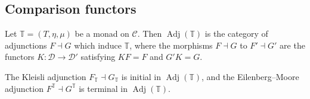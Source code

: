 \subsection{Comparison functors}
\begin{definition}
    Let \( \mathbb T = (T, \eta, \mu) \) be a monad on \( \mathcal C \).
    Then \( \operatorname{Adj}(\mathbb T) \) is the category of adjunctions \( F \dashv G \) which induce \( \mathbb T \), where the morphisms \( F \dashv G \) to \( F' \dashv G' \) are the functors \( K : \mathcal D \to \mathcal D' \) satisfying \( KF = F \) and \( G' K = G \).
\end{definition}
\begin{theorem}
    The Kleisli adjunction \( F_{\mathbb T} \dashv G_{\mathbb T} \) is initial in \( \operatorname{Adj}(\mathbb T) \), and the Eilenberg--Moore adjunction \( F^{\mathbb T} \dashv G^{\mathbb T} \) is terminal in \( \operatorname{Adj}(\mathbb T) \).
\end{theorem}
